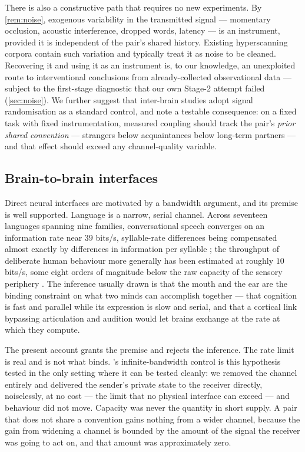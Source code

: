 \documentclass[11pt,a4paper]{article}
\theoremstyle{plain}
\theoremstyle{definition}
\theoremstyle{remark}
\begin{document}
There is also a constructive path that requires no new experiments. By \cref{rem:noise}, exogenous
variability in the transmitted signal --- momentary occlusion, acoustic interference, dropped words, latency
--- is an instrument, provided it is independent of the pair's shared history. Existing hyperscanning
corpora contain such variation and typically treat it as noise to be cleaned. Recovering it and using it as
an instrument is, to our knowledge, an unexploited route to interventional conclusions from
already-collected observational data --- subject to the first-stage diagnostic that our own Stage-2 attempt
failed (\cref{sec:noise}). We further suggest that inter-brain studies adopt signal randomisation as a
standard control, and note a testable consequence: on a fixed task with fixed instrumentation, measured
coupling should track the pair's \emph{prior shared convention} --- strangers below acquaintances below
long-term partners --- and that effect should exceed any channel-quality variable.

\subsection{Brain-to-brain interfaces}\label{sec:bbi}

Direct neural interfaces are motivated by a bandwidth argument, and its premise is well supported. Language
is a narrow, serial channel. Across seventeen languages spanning nine families, conversational speech
converges on an information rate near $39$ bits/s, syllable-rate differences being compensated almost
exactly by differences in information per syllable \citep{coupe2019languages}; the throughput of deliberate
human behaviour more generally has been estimated at roughly $10$ bits/s, some eight orders of magnitude
below the raw capacity of the sensory periphery \citep{zheng2024slowness}. The inference usually drawn is
that the mouth and the ear are the binding constraint on what two minds can accomplish together --- that
cognition is fast and parallel while its expression is slow and serial, and that a cortical link bypassing
articulation and audition would let brains exchange at the rate at which they compute.

The present account grants the premise and rejects the inference. The rate limit is real and is not what
binds. 's infinite-bandwidth control is this hypothesis tested in the only setting where it
can be tested cleanly: we removed the channel entirely and delivered the sender's private state to the
receiver directly, noiselessly, at no cost --- the limit that no physical interface can exceed --- and
behaviour did not move. Capacity was never the quantity in short supply. A pair that does not share a
convention gains nothing from a wider channel, because the gain from widening a channel is bounded by the
amount of the signal the receiver was going to act on, and that amount was approximately zero.
\end{document}
